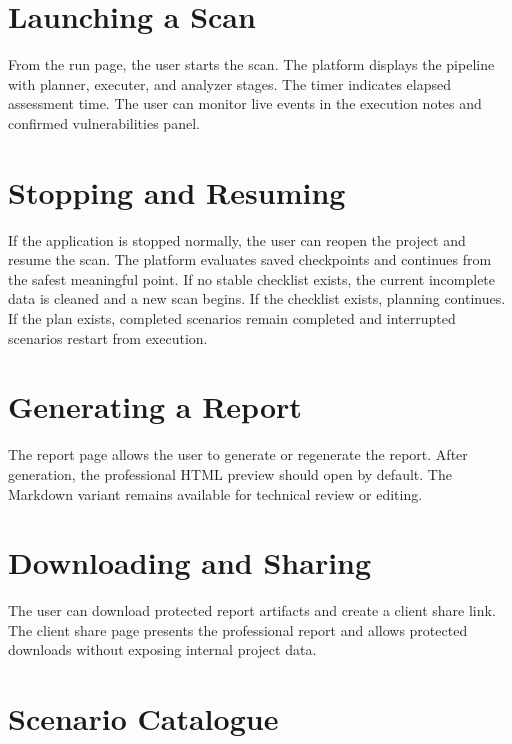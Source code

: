 \documentclass[12pt,a4paper]{report}
\begin{document}
\section*{Launching a Scan}

From the run page, the user starts the scan. The platform displays the pipeline with
planner, executer, and analyzer stages. The timer indicates elapsed assessment time.
The user can monitor live events in the execution notes and confirmed vulnerabilities
panel.

\section*{Stopping and Resuming}

If the application is stopped normally, the user can reopen the project and resume the
scan. The platform evaluates saved checkpoints and continues from the safest meaningful
point. If no stable checklist exists, the current incomplete data is cleaned and a new
scan begins. If the checklist exists, planning continues. If the plan exists, completed
scenarios remain completed and interrupted scenarios restart from execution.

\section*{Generating a Report}

The report page allows the user to generate or regenerate the report. After generation,
the professional HTML preview should open by default. The Markdown variant remains
available for technical review or editing.

\section*{Downloading and Sharing}

The user can download protected report artifacts and create a client share link. The
client share page presents the professional report and allows protected downloads
without exposing internal project data.

\newpage
\section{Scenario Catalogue}
\end{document}
